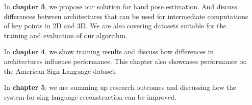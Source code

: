 In \textbf{chapter 3}, we propose our solution for hand pose estimation. And discuss differences between architectures that can be used for intermediate computations of key points in 2D and 3D. We are also covering datasets suitable for the training and evaluation of our algorithm.

In \textbf{chapter 4}, we show training results and discuss how differences in architectures influence performance. This chapter also showcases performance on the American Sign Language dataset.

In \textbf{chapter 5}, we are summing up research outcomes and discussing how the system for sing language reconstruction can be improved. 



\endinput
